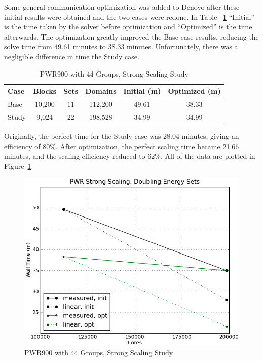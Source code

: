 Some general communication optimization was added to Denovo after these initial results were obtained and the two cases were redone. In Table ~\ref{table:StrongCasesPWR} ``Initial'' is the time taken by the solver before optimization and ``Optimized'' is the time afterwards. The optimization greatly improved the Base case results, reducing the solve time from 49.61 minutes to 38.33 minutes. Unfortunately, there was a negligible difference in time the Study case. 
%
\begin{table}[!h]
\caption{PWR900 with 44 Groups, Strong Scaling Study}
\begin{center}
\begin{tabular}{l c c c c c}
\hline
Case & Blocks & Sets & Domains & Initial (m) & Optimized (m) \\[0.5ex]
\hline
Base   & 10,200 & 11 & 112,200 & 49.61 & 38.33 \\
Study & 9,024    & 22 & 198,528 & 34.99 & 34.99 \\
\hline
\end{tabular}
\end{center}
\label{table:StrongCasesPWR}
\end{table}
%
Originally, the perfect time for the Study case was 28.04 minutes, giving an efficiency of 80\%. After optimization, the perfect scaling time became 21.66 minutes, and the scaling efficiency reduced to 62\%. All of the data are plotted in Figure~\ref{fig:PWRstrongScaling}. 
\begin{figure}[!h]
  \begin{center}
    \includegraphics [width=.7\textwidth, height=.45\textheight ] {PWRstrongScaling}
  \end{center}
  \caption{PWR900 with 44 Groups, Strong Scaling Study}
  \label{fig:PWRstrongScaling}
\end{figure}

